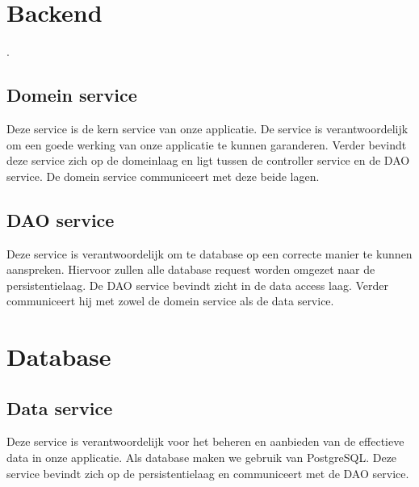 \documentclass[11pt,openany]{article}
\begin{document}
	\section{Backend}.
	\subsection{Domein service}
	Deze service is de kern service van onze applicatie. De service is verantwoordelijk om een goede werking van onze applicatie te kunnen garanderen. Verder bevindt deze service zich op de domeinlaag en ligt tussen de controller service en de DAO service. De domein service communiceert met deze beide lagen.
	\subsection{DAO service}
	Deze service is verantwoordelijk om te database op een correcte manier te kunnen aanspreken. Hiervoor zullen alle database request worden omgezet naar de persistentielaag. De DAO service bevindt zicht in de data access laag. Verder communiceert hij met zowel de domein service als de data service.
	\section{Database}
	\subsection{Data service}
	Deze service is verantwoordelijk voor het beheren en aanbieden van de effectieve data in onze applicatie. Als database maken we gebruik van PostgreSQL. Deze service bevindt zich op de persistentielaag en communiceert met de DAO service.
\end{document}
